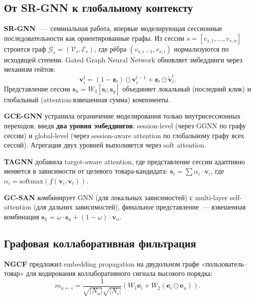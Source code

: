 \subsection{От SR-GNN к глобальному контексту}
\label{subsec:ch1:srgnn}

\textbf{SR-GNN} \cite{wu2019srgnn}~--- семинальная работа, впервые моделирующая сессионные последовательности как ориентированные графы. Из сессии $s = [v_{s,1}, \ldots, v_{s,n}]$ строится граф $\mathcal{G}_s = (\mathcal{V}_s, \mathcal{E}_s)$, где рёбра $(v_{s,i-1}, v_{s,i})$ нормализуются по исходящей степени. Gated Graph Neural Network обновляет эмбеддинги через механизм гейтов:
\begin{equation}
    \mathbf{v}_i^l = (1 - \mathbf{z}_t) \odot \mathbf{v}_i^{l-1} + \mathbf{z}_t \odot \tilde{\mathbf{v}}_i^l.
\end{equation}
Представление сессии $\mathbf{s}_h = W_3[\mathbf{s}_l; \mathbf{s}_g]$ объединяет локальный (последний клик) и глобальный (attention-взвешенная сумма) компоненты.

\textbf{GCE-GNN} \cite{wang2020gcegnn} устранила ограничение моделирования только внутрисессионных переходов, введя \textbf{два уровня эмбеддингов}: session-level (через GGNN по графу сессии) и global-level (через session-aware attention по глобальному графу всех сессий). Агрегация двух уровней выполняется через soft attention.

\textbf{TAGNN} \cite{yu2020tagnn} добавила target-aware attention, где представление сессии адаптивно меняется в зависимости от целевого товара-кандидата: $\mathbf{s}_t = \sum \alpha_i \cdot \mathbf{v}_i$, где $\alpha_i = \text{softmax}(f(\mathbf{v}_i, \mathbf{v}_t))$.

\textbf{GC-SAN} \cite{xu2019gcsan} комбинирует GNN (для локальных зависимостей) с multi-layer self-attention (для дальних зависимостей), финальное представление~--- взвешенная комбинация $\mathbf{s}_h = \omega \cdot \mathbf{s}_a + (1 - \omega) \cdot \mathbf{v}_n$.

\subsection{Графовая коллаборативная фильтрация}
\label{subsec:ch1:gcf}

\textbf{NGCF} \cite{wang2019ngcf} предложил embedding propagation на двудольном графе «пользователь–товар» для кодирования коллаборативного сигнала высокого порядка:
\begin{equation}
    m_{u \leftarrow i} = \frac{1}{\sqrt{|N_u|}\sqrt{|N_i|}}\left(W_1 \mathbf{e}_i + W_2(\mathbf{e}_i \odot \mathbf{e}_u)\right).
\end{equation}


